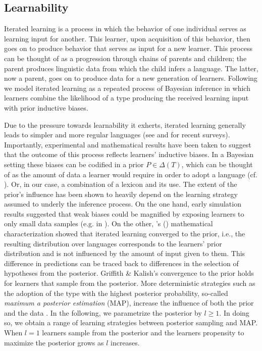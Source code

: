 \documentclass[a4paper]{article}
\newcommand{\citeposs}[2][]{\citeauthor{#2}'s (\citeyear[#1]{#2})}
\begin{document}

\subsection{Learnability}\label{sec:learnability}
Iterated learning is a process in which the behavior of one individual serves as learning input for another. This learner, upon acquisition of this behavior, then goes on to produce behavior that serves as input for a new learner. This process can be thought of as a progression through chains of parents and children; the parent produces linguistic data from which the child infers a language. The latter, now a parent, goes on to produce data for a new generation of learners. Following \citet{griffiths+kalish:2007} we model iterated learning as a repeated process of Bayesian inference in which learners combine the likelihood of a type producing the received learning input with prior inductive biases. 

Due to the pressure towards learnability it exherts, iterated learning generally leads to simpler and more regular languages (see \citealt{kirby+etal:2014} and \citealt{tamariz+kirby:2016} for recent surveys). Importantly, experimental and mathematical results have been taken to suggest that the outcome of this process reflects learners' inductive biases. In a Bayesian setting these biases can be codified in a prior $P \in \Delta(T)$, which can be thought of as the amount of data a learner would require in order to adopt a language (cf. \citealt[450]{griffiths+kalish:2007}). Or, in our case, a combination of a lexicon and its use. The extent of the prior's influence has been shown to heavily depend on the learning strategy assumed to underly the inference process. On the one hand, early simulation results suggested that weak biases could be magnified by exposing learners to only small data samples (e.g. in \citealt{brighton:2002}). On the other, \citeposs{griffiths+kalish:2007} mathematical characterization showed that iterated learning converged to the prior, i.e., the resulting distribution over languages corresponds to the learners' prior distribution and is not influenced by the amount of input given to them. This difference in predictions can be traced back to differences in the selection of hypotheses from the posterior. Griffith \& Kalish's convergence to the prior holds for learners that sample from the posterior. More deterministic strategies such as the adoption of the type with the highest posterior probability, so-called {\it maximum a posterior estimation} (MAP), increase the influence of both the prior and the data \citep{griffiths+kalish:2007,kirby+etal:2007}. In the following, we parametrize the posterior by $l \geq 1$. In doing so, we obtain a range of learning strategies between posterior sampling and MAP. When $l = 1$ learners sample from the posterior and the learners propensity to maximize the posterior grows as $l$ increases.
\end{document}
